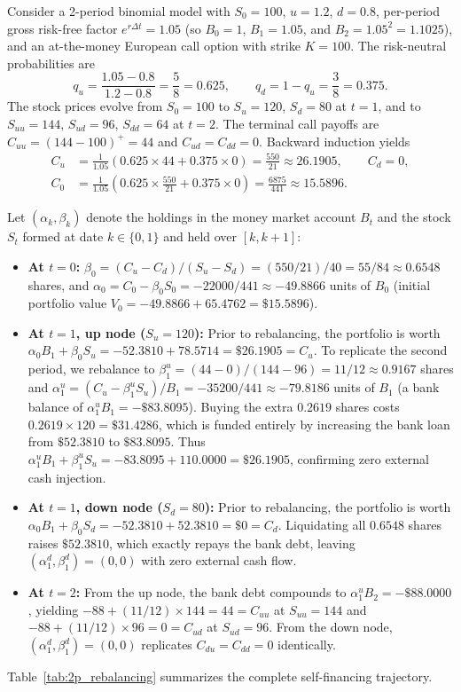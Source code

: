 \begin{example}
\label{ex:2p_dynamic_rebalancing}
Consider a 2-period binomial model with $S_0 = 100$, $u = 1.2$, $d = 0.8$, per-period gross risk-free factor $e^{r \Delta t} = 1.05$ (so $B_0 = 1$, $B_1 = 1.05$, and $B_2 = 1.05^2 = 1.1025$), and an at-the-money European call option with strike $K = 100$. The risk-neutral probabilities are
\[
    q_u = \frac{1.05 - 0.8}{1.2 - 0.8} = \frac{5}{8} = 0.625, \qquad q_d = 1 - q_u = \frac{3}{8} = 0.375.
\]
The stock prices evolve from $S_0 = 100$ to $S_u = 120$, $S_d = 80$ at $t = 1$, and to $S_{uu} = 144$, $S_{ud} = 96$, $S_{dd} = 64$ at $t = 2$. The terminal call payoffs are $C_{uu} = (144 - 100)^+ = 44$ and $C_{ud} = C_{dd} = 0$. Backward induction yields
\begin{align*}
    C_u &= \frac{1}{1.05}(0.625 \times 44 + 0.375 \times 0) = \frac{550}{21} \approx 26.1905, \qquad C_d = 0, \\
    C_0 &= \frac{1}{1.05}\left(0.625 \times \frac{550}{21} + 0.375 \times 0\right) = \frac{6875}{441} \approx 15.5896.
\end{align*}

Let $(\alpha_k, \beta_k)$ denote the holdings in the money market account $B_t$ and the stock $S_t$ formed at date $k \in \{0, 1\}$ and held over $[k, k+1]$:
\begin{itemize}
    \item \textbf{At $t = 0$:} $\beta_0 = (C_u - C_d)/(S_u - S_d) = (550/21)/40 = 55/84 \approx 0.6548$ shares, and $\alpha_0 = C_0 - \beta_0 S_0 = -22000/441 \approx -49.8866$ units of $B_0$ (initial portfolio value $V_0 = -49.8866 + 65.4762 = \$15.5896$).
    \item \textbf{At $t = 1$, up node ($S_u = 120$):} Prior to rebalancing, the portfolio is worth $\alpha_0 B_1 + \beta_0 S_u = -52.3810 + 78.5714 = \$26.1905 = C_u$. To replicate the second period, we rebalance to $\beta_1^u = (44 - 0)/(144 - 96) = 11/12 \approx 0.9167$ shares and $\alpha_1^u = (C_u - \beta_1^u S_u)/B_1 = -35200/441 \approx -79.8186$ units of $B_1$ (a bank balance of $\alpha_1^u B_1 = -\$83.8095$). Buying the extra $0.2619$ shares costs $0.2619 \times 120 = \$31.4286$, which is funded entirely by increasing the bank loan from $\$52.3810$ to $\$83.8095$. Thus $\alpha_1^u B_1 + \beta_1^u S_u = -83.8095 + 110.0000 = \$26.1905$, confirming zero external cash injection.
    \item \textbf{At $t = 1$, down node ($S_d = 80$):} Prior to rebalancing, the portfolio is worth $\alpha_0 B_1 + \beta_0 S_d = -52.3810 + 52.3810 = \$0 = C_d$. Liquidating all $0.6548$ shares raises $\$52.3810$, which exactly repays the bank debt, leaving $(\alpha_1^d, \beta_1^d) = (0, 0)$ with zero external cash flow.
    \item \textbf{At $t = 2$:} From the up node, the bank debt compounds to $\alpha_1^u B_2 = -\$88.0000$, yielding $-88 + (11/12) \times 144 = 44 = C_{uu}$ at $S_{uu} = 144$ and $-88 + (11/12) \times 96 = 0 = C_{ud}$ at $S_{ud} = 96$. From the down node, $(\alpha_1^d, \beta_1^d) = (0, 0)$ replicates $C_{du} = C_{dd} = 0$ identically.
\end{itemize}
Table~\ref{tab:2p_rebalancing} summarizes the complete self-financing trajectory.


\end{example}
